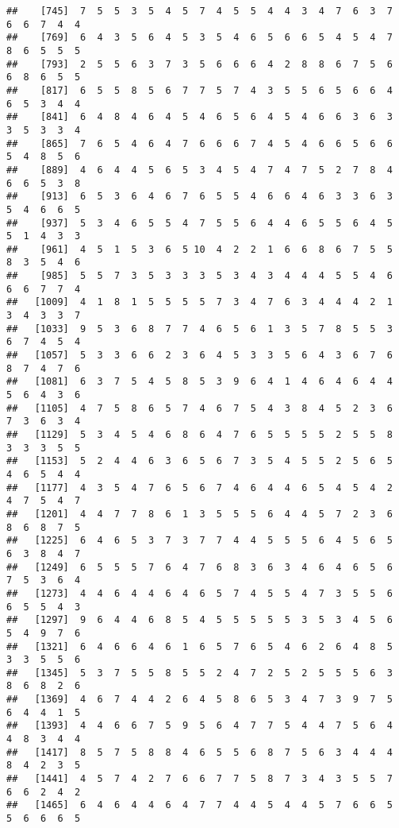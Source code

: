 \documentclass[
]{book}
\begin{document}
\begin{verbatim}
##    [745]  7  5  5  3  5  4  5  7  4  5  5  4  4  3  4  7  6  3  7  6  6  7  4  4
##    [769]  6  4  3  5  6  4  5  3  5  4  6  5  6  6  5  4  5  4  7  8  6  5  5  5
##    [793]  2  5  5  6  3  7  3  5  6  6  6  4  2  8  8  6  7  5  6  6  8  6  5  5
##    [817]  6  5  5  8  5  6  7  7  5  7  4  3  5  5  6  5  6  6  4  6  5  3  4  4
##    [841]  6  4  8  4  6  4  5  4  6  5  6  4  5  4  6  6  3  6  3  3  5  3  3  4
##    [865]  7  6  5  4  6  4  7  6  6  6  7  4  5  4  6  6  5  6  6  5  4  8  5  6
##    [889]  4  6  4  4  5  6  5  3  4  5  4  7  4  7  5  2  7  8  4  6  6  5  3  8
##    [913]  6  5  3  6  4  6  7  6  5  5  4  6  6  4  6  3  3  6  3  5  4  6  6  5
##    [937]  5  3  4  6  5  5  4  7  5  5  6  4  4  6  5  5  6  4  5  5  1  4  3  3
##    [961]  4  5  1  5  3  6  5 10  4  2  2  1  6  6  8  6  7  5  5  8  3  5  4  6
##    [985]  5  5  7  3  5  3  3  3  5  3  4  3  4  4  4  5  5  4  6  6  6  7  7  4
##   [1009]  4  1  8  1  5  5  5  5  7  3  4  7  6  3  4  4  4  2  1  3  4  3  3  7
##   [1033]  9  5  3  6  8  7  7  4  6  5  6  1  3  5  7  8  5  5  3  6  7  4  5  4
##   [1057]  5  3  3  6  6  2  3  6  4  5  3  3  5  6  4  3  6  7  6  8  7  4  7  6
##   [1081]  6  3  7  5  4  5  8  5  3  9  6  4  1  4  6  4  6  4  4  5  6  4  3  6
##   [1105]  4  7  5  8  6  5  7  4  6  7  5  4  3  8  4  5  2  3  6  7  3  6  3  4
##   [1129]  5  3  4  5  4  6  8  6  4  7  6  5  5  5  5  2  5  5  8  3  3  3  5  5
##   [1153]  5  2  4  4  6  3  6  5  6  7  3  5  4  5  5  2  5  6  5  4  6  5  4  4
##   [1177]  4  3  5  4  7  6  5  6  7  4  6  4  4  6  5  4  5  4  2  4  7  5  4  7
##   [1201]  4  4  7  7  8  6  1  3  5  5  5  6  4  4  5  7  2  3  6  8  6  8  7  5
##   [1225]  6  4  6  5  3  7  3  7  7  4  4  5  5  5  6  4  5  6  5  6  3  8  4  7
##   [1249]  6  5  5  5  7  6  4  7  6  8  3  6  3  4  6  4  6  5  6  7  5  3  6  4
##   [1273]  4  4  6  4  4  6  4  6  5  7  4  5  5  4  7  3  5  5  6  6  5  5  4  3
##   [1297]  9  6  4  4  6  8  5  4  5  5  5  5  5  3  5  3  4  5  6  5  4  9  7  6
##   [1321]  6  4  6  6  4  6  1  6  5  7  6  5  4  6  2  6  4  8  5  3  3  5  5  6
##   [1345]  5  3  7  5  5  8  5  5  2  4  7  2  5  2  5  5  5  6  3  8  6  8  2  6
##   [1369]  4  6  7  4  4  2  6  4  5  8  6  5  3  4  7  3  9  7  5  6  4  4  1  5
##   [1393]  4  4  6  6  7  5  9  5  6  4  7  7  5  4  4  7  5  6  4  4  8  3  4  4
##   [1417]  8  5  7  5  8  8  4  6  5  5  6  8  7  5  6  3  4  4  4  8  4  2  3  5
##   [1441]  4  5  7  4  2  7  6  6  7  7  5  8  7  3  4  3  5  5  7  6  6  2  4  2
##   [1465]  6  4  6  4  4  6  4  7  7  4  4  5  4  4  5  7  6  6  5  5  6  6  6  5

\end{verbatim}
\end{document}
